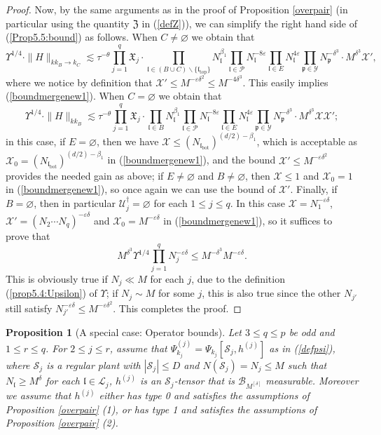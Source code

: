 \documentclass[11 pt,reqno]{amsart}
\newtheorem{prop}[thm]{Proposition}
\theoremstyle{definition}
\theoremstyle{remark}
\numberwithin{equation}{section}
\newcommand{\Sc}{\mathcal{S}}
\newcommand{\Lc}{\mathcal{L}}
\newcommand{\Pc}{\mathcal{P}}
\newcommand{\Uc}{\mathcal{U}}
\newcommand{\Bc}{\mathcal{B}}
\newcommand{\Xc}{\mathcal{X}}
\newcommand{\Yc}{\mathcal{Y}}
\newcommand{\pf}{\mathfrak{p}}
\newcommand{\Xf}{\mathfrak{X}}
\newcommand{\Zf}{\mathfrak{Z}}
\newcommand{\lf}{\mathfrak{l}}
\begin{document}
{\begin{proof}
Now, by the same arguments as in the proof of Proposition \ref{overpair} (in particular using the quantity $\Zf$ in (\ref{defZ})), we can simplify the right hand side of (\ref{Prop5.5:bound}) as follows. When $C\neq\varnothing$ we obtain that
\begin{equation}\label{Prop5.5:bound2}\Upsilon^{1/4}\cdot\|H\|_{kk_B\to k_C}\lesssim\tau^{-\theta}\prod_{j=1}^q\Xf_j\cdot\prod_{\lf\in(B\cup C)\backslash\{\lf_{\mathrm{top}}\}}N_\lf^{\beta_1}\prod_{\lf\in\Pc}N_\lf^{-8\varepsilon}\prod_{\lf\in E}N_\lf^{4\varepsilon}\prod_{\pf\in\Yc}N_\pf^{-\delta^3}\cdot M^{\delta^3}\Xc',
\end{equation} where we notice by definition that $\Xc'\leq M^{-\varepsilon\delta^2}\leq M^{-4\delta^3}$. This easily implies (\ref{boundmergenew1}). When $C=\varnothing$ we obtain that
\begin{equation}\label{Prop5.5:bound3}\Upsilon^{1/4}\cdot\|H\|_{kk_B}\lesssim\tau^{-\theta}\prod_{j=1}^q\Xf_j\cdot\prod_{\lf\in B}N_\lf^{\beta_1}\prod_{\lf\in\Pc}N_\lf^{-8\varepsilon}\prod_{\lf\in E}N_\lf^{4\varepsilon}\prod_{\pf\in\Yc}N_\pf^{-\delta^3}\cdot M^{\delta^3}\Xc\Xc';
\end{equation} in this case, if $E=\varnothing$, then we have $\Xc\leq (N_{\lf_{\mathrm{bot}}})^{(d/2)-\beta_1}$, which is acceptable as $\Xc_0=(N_{\lf_{\mathrm{bot}}})^{(d/2)-\beta_1}$ in (\ref{boundmergenew1}), and the bound $\Xc'\leq M^{-\varepsilon\delta^2}$ provides the needed gain  as above; if $E\neq\varnothing$ and $B\neq\varnothing$, then $\Xc\leq 1$ and $\Xc_0=1$ in (\ref{boundmergenew1}), so once again we can use the bound of $\Xc'$. Finally, if $B=\varnothing$, then in particular $\Uc_j^\dagger=\varnothing$ for each $1\leq j\leq q$. In this case $\Xc=N_1^{-\varepsilon\delta}$, $\Xc'=(N_2\cdots N_q)^{-\varepsilon\delta}$ and $\Xc_0=M^{-\varepsilon\delta}$ in (\ref{boundmergenew1}), so it suffices to prove that
\[M^{\delta^3}\Upsilon^{1/4}\prod_{j=1}^q N_j^{-\varepsilon\delta}\leq M^{-\delta^3}M^{-\varepsilon\delta}.\] This is obviously true if $N_j\ll M$ for each $j$, due to the definition (\ref{prop5.4:Upsilon}) of $\Upsilon$; if $N_j\sim M$ for some $j$, this is also true since the other $N_{j'}$ still satisfy $N_{j'}^{-\varepsilon\delta}\leq M^{-\varepsilon\delta^2}$. This completes the proof.
\end{proof}
\begin{prop}[A special case: Operator bounds]\label{overpair3} Let $3\leq q\leq p$ be odd and $1\leq r\leq q$. For $2\leq j\leq r$, assume that $\Psi_{k_j}^{(j)}=\Psi_{k_j}[\Sc_j,h^{(j)}]$ as in (\ref{defpsi}), where $\Sc_j$ is a regular plant with $|\Sc_j|\leq D$ and $N(\Sc_j)=N_j\leq M$ such that $N_\lf\geq M^\delta$ for each $\lf\in\Lc_j$, $h^{(j)}$ is an $\Sc_j$-tensor that is $\Bc_{M^{[\delta]}}$ measurable. Moreover we assume that $h^{(j)}$ either has type 0 and satisfies the assumptions of Proposition \ref{overpair} (1), or has type 1 and satisfies the assumptions of Proposition \ref{overpair} (2).


\end{prop}}
\end{document}
